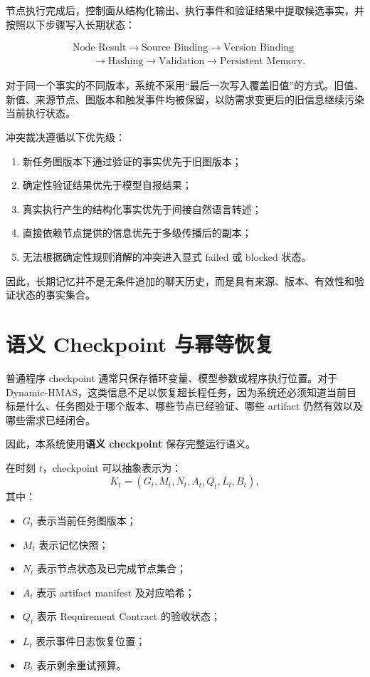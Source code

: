 \documentclass[UTF8,a4paper,12pt,oneside]{ctexbook}
\begin{document}
节点执行完成后，控制面从结构化输出、执行事件和验证结果中提取候选事实，并按照以下步骤写入长期状态：

\[
\begin{aligned}
&\text{Node Result}
\rightarrow \text{Source Binding}
\rightarrow \text{Version Binding} \\[3pt]
&\qquad\rightarrow \text{Hashing}
\rightarrow \text{Validation}
\rightarrow \text{Persistent Memory}.
\end{aligned}
\]

对于同一个事实的不同版本，系统不采用“最后一次写入覆盖旧值”的方式。旧值、新值、来源节点、图版本和触发事件均被保留，以防需求变更后的旧信息继续污染当前执行状态。

冲突裁决遵循以下优先级：

\begin{enumerate}
    \item 新任务图版本下通过验证的事实优先于旧图版本；
    \item 确定性验证结果优先于模型自报结果；
    \item 真实执行产生的结构化事实优先于间接自然语言转述；
    \item 直接依赖节点提供的信息优先于多级传播后的副本；
    \item 无法根据确定性规则消解的冲突进入显式 failed 或 blocked 状态。
\end{enumerate}

因此，长期记忆并不是无条件追加的聊天历史，而是具有来源、版本、有效性和验证状态的事实集合。


\section{语义 Checkpoint 与幂等恢复}

普通程序 checkpoint 通常只保存循环变量、模型参数或程序执行位置。对于 Dynamic-HMAS，这类信息不足以恢复超长程任务，因为系统还必须知道当前目标是什么、任务图处于哪个版本、哪些节点已经验证、哪些 artifact 仍然有效以及哪些需求已经闭合。

因此，本系统使用\textbf{语义 checkpoint} 保存完整运行语义。

在时刻 $t$，checkpoint 可以抽象表示为：
\[
K_t=
(
G_t,
M_t,
N_t,
A_t,
Q_t,
L_t,
B_t
),
\]
其中：

\begin{itemize}
    \item $G_t$ 表示当前任务图版本；
    \item $M_t$ 表示记忆快照；
    \item $N_t$ 表示节点状态及已完成节点集合；
    \item $A_t$ 表示 artifact manifest 及对应哈希；
    \item $Q_t$ 表示 Requirement Contract 的验收状态；
    \item $L_t$ 表示事件日志恢复位置；
    \item $B_t$ 表示剩余重试预算。
\end{itemize}
\end{document}

